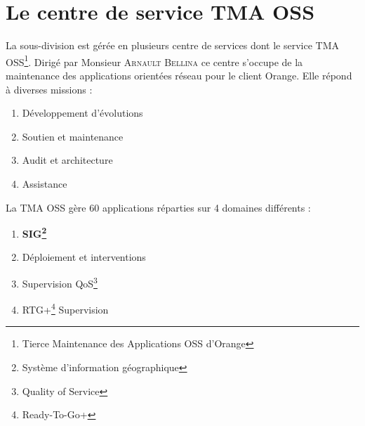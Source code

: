 \section{Le centre de service TMA OSS}

La sous-division est gérée en plusieurs centre de services dont le service TMA OSS\footnote{Tierce Maintenance des Applications OSS d’Orange}.
Dirigé par Monsieur \textsc{Arnault Bellina} ce centre s'occupe de la maintenance des applications orientées réseau pour le client Orange.
Elle répond à diverses missions :

\begin{enumerate}
\item Développement d'évolutions
\item Soutien et maintenance
\item Audit et architecture
\item Assistance\\
\end{enumerate}

La TMA OSS gère 60 applications réparties sur 4 domaines différents :

\begin{enumerate}
\item \textbf{SIG\footnote{Système d’information géographique }}
\item Déploiement et interventions
\item Supervision QoS\footnote{Quality of Service}
\item RTG+\footnote{Ready-To-Go+} Supervision\\
\end{enumerate}

